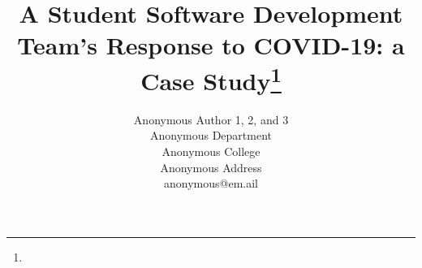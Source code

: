 \documentclass{article}
\title{A Student Software Development Team's Response to COVID-19: a Case Study\footnote{\protect}}
\author{
Anonymous Author 1, 2, and 3\\
Anonymous Department\\
Anonymous College\\
Anonymous Address\\
anonymous@em.ail\\


}
\begin{document}
\maketitle

\begin{abstract}
 
\end{abstract}


% 





\medskip



\end{document}
